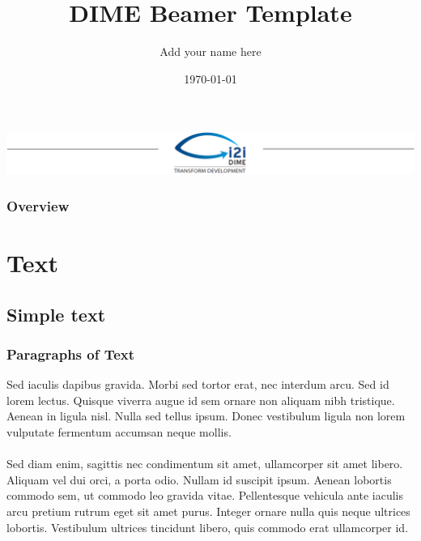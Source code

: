 \documentclass{beamer}
\title{DIME Beamer Template}
\author{Add your name here}
\institute{DIME - World Bank}
\date{\today}
\begin{document}
	
\begin{frame}
	\includegraphics[width=\textwidth]{img/Header.png}
	\vspace{-0.2cm}
	\titlepage 	 %
\end{frame}

\begin{frame}
\frametitle{Overview} %
\tableofcontents %
\end{frame}

\section{Text}
\subsection{Simple text}

\begin{frame}
\frametitle{Paragraphs of Text}
Sed iaculis dapibus gravida. Morbi sed tortor erat, nec interdum arcu. Sed id lorem lectus. Quisque viverra augue id sem ornare non aliquam nibh tristique. Aenean in ligula nisl. Nulla sed tellus ipsum. Donec vestibulum ligula non lorem vulputate fermentum accumsan neque mollis.\\~\\

Sed diam enim, sagittis nec condimentum sit amet, ullamcorper sit amet libero. Aliquam vel dui orci, a porta odio. Nullam id suscipit ipsum. Aenean lobortis commodo sem, ut commodo leo gravida vitae. Pellentesque vehicula ante iaculis arcu pretium rutrum eget sit amet purus. Integer ornare nulla quis neque ultrices lobortis. Vestibulum ultrices tincidunt libero, quis commodo erat ullamcorper id.
\end{frame}
\end{document}
